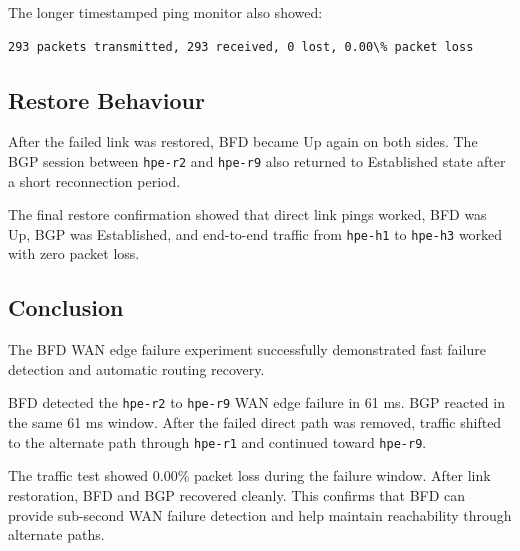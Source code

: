 The longer timestamped ping monitor also showed:

\begin{verbatim}
293 packets transmitted, 293 received, 0 lost, 0.00\% packet loss
\end{verbatim}

\subsection{Restore Behaviour}

After the failed link was restored, BFD became Up again on both sides. The BGP session between \texttt{hpe-r2} and \texttt{hpe-r9} also returned to Established state after a short reconnection period.

The final restore confirmation showed that direct link pings worked, BFD was Up, BGP was Established, and end-to-end traffic from \texttt{hpe-h1} to \texttt{hpe-h3} worked with zero packet loss.



\subsection{Conclusion}

The BFD WAN edge failure experiment successfully demonstrated fast failure detection and automatic routing recovery.

BFD detected the \texttt{hpe-r2} to \texttt{hpe-r9} WAN edge failure in 61 ms. BGP reacted in the same 61 ms window. After the failed direct path was removed, traffic shifted to the alternate path through \texttt{hpe-r1} and continued toward \texttt{hpe-r9}.

The traffic test showed 0.00\% packet loss during the failure window. After link restoration, BFD and BGP recovered cleanly. This confirms that BFD can provide sub-second WAN failure detection and help maintain reachability through alternate paths.
